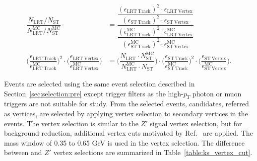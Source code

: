 \begin{align}
    \dfrac{N_{\mathrm{LRT}} / N_{\mathrm{ST}}}{N_{\mathrm{LRT}}^{\mathrm{MC}} / N_{\mathrm{ST}}^{\mathrm{MC}}} \cdot &=
    \dfrac{\dfrac{(\epsilon_{\mathrm{LRT~Track}})^{2} \cdot \epsilon_{\mathrm{LRT~Vertex}}}{(\epsilon_{\mathrm{ST~Track}})^{2} \cdot \epsilon_{\mathrm{ST~Vertex}}}}{\dfrac{(\epsilon_{\mathrm{LRT~Track}}^{\mathrm{MC}})^{2} \cdot \epsilon_{\mathrm{LRT~Vertex}}^{\mathrm{MC}}}{(\epsilon_{\mathrm{ST~Track}}^{\mathrm{MC}})^{2} \cdot \epsilon_{\mathrm{ST~Vertex}}^{\mathrm{MC}}}} 
    \\[10pt]
    \Big( \dfrac{\epsilon_{\mathrm{LRT~Track}}}{\epsilon_{\mathrm{LRT~Track}}^{\mathrm{MC}}}\Big)^{2} \cdot
    \Big( \dfrac{\epsilon_{\mathrm{LRT~Vertex}}}{\epsilon_{\mathrm{LRT~Vertex}}^{\mathrm{MC}}}\Big) &=
    \Big( \dfrac{N_{\mathrm{LRT}} \cdot N_{\mathrm{ST}}^{\mathrm{MC}}}{N_{\mathrm{LRT}}^{\mathrm{MC}} \cdot N_{\mathrm{ST}}} \Big) \cdot
    \Big( \dfrac{\epsilon_{\mathrm{ST~Track}}}{\epsilon_{\mathrm{ST~Track}}^{\mathrm{MC}}}\Big)^{2} \cdot
    \Big( \dfrac{\epsilon_{\mathrm{ST~Vertex}}}{\epsilon_{\mathrm{ST~Vertex}}^{\mathrm{MC}}}\Big).
\label{eq:Ks_eq3}
\end{align}

Events are selected using the same event selection described in Section~\ref{sec:selection:pre} except trigger filters as the high-$p_{T}$ photon or muon triggers are not suitable for \Ks study. From the selected events, \Ks candidates, referred as \Ks vertices, are selected by applying \Ks vertex selection to secondary vertices in the events. The \Ks vertex selection is similar to the $Z'$ signal vertex selection, but %
for background reduction, additional vertex cuts motivated by Ref.~\cite{Oh:1951024} are applied. The mass window of 0.35 to 0.65 GeV is used in the \Ks vertex selection. The difference between \Ks and $Z'$ vertex selections are summarized in Table~\ref{table:ks_vertex_cut}. %

